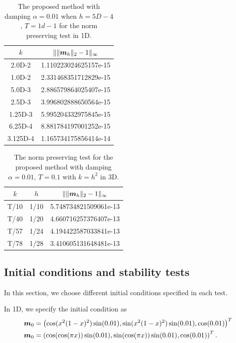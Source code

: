 \documentclass[preprint,times,3p]{elsarticle}
\def\m{\mbox{\boldmath $m$}}
\begin{document}
\begin{table}[htbp]
	\centering
	\caption{The proposed method with damping $\alpha=0.01$ when $h = 5D-4$, $T=1d-1$ for the norm preserving test in 1D.}\label{tab-8}
	\begin{tabular}{|c|c|}
		\hline
		$k$ & $\|\|\m_h\|_2-1\|_\infty$ \\
		\hline
	    2.0D-2 & 1.110223024625157e-15 \\
		1.0D-2 & 2.331468351712829e-15 \\
		5.0D-3 & 2.886579864025407e-15\\
		2.5D-3 & 3.996802888650564e-15 \\
		1.25D-3 & 5.995204332975845e-15 \\
		6.25D-4 & 8.881784197001252e-15 \\
		3.125D-4 & 1.165734175856414e-14\\
		\hline
	\end{tabular}
\end{table}


\begin{table}[htbp]
	\centering
	\caption{The norm preserving test for the proposed method with damping $\alpha=0.01$, $T=0.1$ with $k=h^2$ in 3D. }\label{tab-9}
	\begin{tabular}{|c|c|c|}
		\hline
		$k$&$h$ & $\|\|\m_h\|_2-1\|_\infty$  \\
	\hline
	T/10&1/10& 5.748734821509061e-13\\
	T/40 &1/20&4.660716257376407e-13 \\
	T/57 &1/24&4.194422587033841e-13 \\
	T/78&1/28& 3.410605131648481e-13\\
	\hline 
	\end{tabular}
\end{table}

\subsection{Initial conditions and stability tests}

In this section, we choose different initial conditions specified in each test.

In 1D, we specify the initial condition as
\begin{align*}
    \m_0&=\left(\cos(x^2(1-x)^2)\sin (0.01), \sin(x^2(1-x)^2)\sin (0.01), \cos (0.01)\right)^T\\
    \m_0&=\left(\cos(\cos(\pi x))\sin (0.01), \sin(\cos(\pi x))\sin (0.01), \cos (0.01)\right)^T.
\end{align*}
\end{document}
